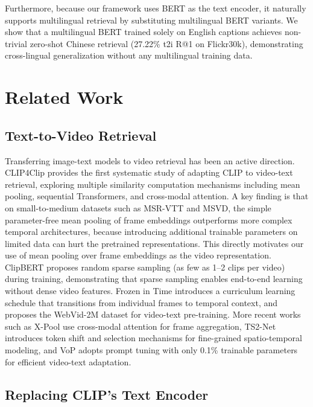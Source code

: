 \documentclass[10pt,leqno]{amsart}
\begin{document}
Furthermore, because our framework uses BERT as the text encoder, it naturally supports multilingual retrieval by substituting multilingual BERT variants. We show that a multilingual BERT trained solely on English captions achieves non-trivial zero-shot Chinese retrieval (27.22\% t2i R@1 on Flickr30k), demonstrating cross-lingual generalization without any multilingual training data.

\section{Related Work}

\subsection{Text-to-Video Retrieval}

Transferring image-text models to video retrieval has been an active direction. CLIP4Clip \citep{luo2022clip4clip} provides the first systematic study of adapting CLIP to video-text retrieval, exploring multiple similarity computation mechanisms including mean pooling, sequential Transformers, and cross-modal attention. A key finding is that on small-to-medium datasets such as MSR-VTT and MSVD, the simple parameter-free mean pooling of frame embeddings outperforms more complex temporal architectures, because introducing additional trainable parameters on limited data can hurt the pretrained representations. This directly motivates our use of mean pooling over frame embeddings as the video representation. ClipBERT \citep{lei2021clipbert} proposes random sparse sampling (as few as 1--2 clips per video) during training, demonstrating that sparse sampling enables end-to-end learning without dense video features. Frozen in Time \citep{bain2021frozen} introduces a curriculum learning schedule that transitions from individual frames to temporal context, and proposes the WebVid-2M dataset for video-text pre-training. More recent works such as X-Pool \citep{gorti2022xpool} use cross-modal attention for frame aggregation, TS2-Net \citep{liu2022ts2net} introduces token shift and selection mechanisms for fine-grained spatio-temporal modeling, and VoP \citep{huang2023vop} adopts prompt tuning with only 0.1\% trainable parameters for efficient video-text adaptation.

\subsection{Replacing CLIP's Text Encoder}
\end{document}
